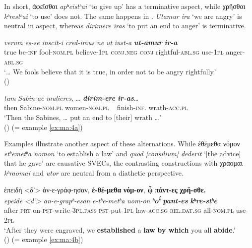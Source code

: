 \documentclass[output=paper,colorlinks,citecolor=brown]{langscibook}
\begin{document}
\z

In short, ἀφεῖσθαι \emph{apʰeistʰai} `to give up' has
a terminative aspect, while χρῆσθαι \emph{kʰrestʰai}
`to use' does not. The same happens in . \emph{Utamur ira} `we are angry' is
neutral in aspect, whereas \emph{dirimere iras} `to put an end to anger' is terminative.


\ea\label{ex:ma:6}

\ea\label{ex:ma:6a}


\gll \emph{verum} \emph{es-se} \emph{inscit-i} \emph{cred-imus} \emph{ne} \emph{ut}
\emph{iust-a} \textbf{\textit{ut-amur}} \textbf{\textit{ir-a}}\\
true be-\textsc{inf} fool-\textsc{nom.pl} believe-\textsc{1pl} \textsc{conj.neg} \textsc{conj} rightful\textsc{-abl.sg} use-\textsc{1pl} anger-\textsc{abl.sg}\\
\glt `\ldots{} We fools believe that it is true, in order not to be angry rightfully.' \\
\hspace*{\fill}()

\ex\label{ex:ma:6b}

\gll \emph{tum} \emph{Sabin-ae} \emph{mulieres,} \ldots{} \textbf{\itshape dirim-ere} \textbf{\itshape ir-as}\ldots{}\\
then Sabine-\textsc{nom.pl} women-\textsc{nom.pl} ~ finish-\textsc{inf.} wrath-\textsc{acc.pl}\\
\glt `Then the Sabines, \ldots{} put an end to {[}their{]} wrath \ldots' \\
\hspace*{\fill}() (=
example \ref{ex:ma:4a})

\z

\z

Examples  illustrate another aspect of these alternations. While
ἐθέμεθα νόμον \emph{etʰemetʰa nomon} `to establish a
law' and \emph{quod {[}consilium{]} dederit} `{[}the advice{]} that he gave' are causative
SVECs, the contrasting constructions with χράομαι \emph{kʰraomai} and
\emph{utor} are neutral from a diathetic perspective.


\ea\label{ex:ma:7}

\glll ἐπειδὴ <δ'> ἀν-ε-γράφ-ησαν, \textbf{ἐ-θέ-μεθα} \textbf{νόμ-ον}, \textbf{ᾧ} \textbf{πάντ-ες} \textbf{χρῆ-σθε.}\\
 \textit{epeide} \textit{<d'>} \textit{an-e-grapʰ-esan} \textit{e-tʰe-metʰa} \textit{nom-on} \textit{\textbf{ʰo\textsuperscript{i}}} \textit{\textbf{pant-es}}
\textit{\textbf{kʰre-stʰe}}\\
after \textsc{prt} on-\textsc{pst-}write-\textsc{3pl.pass} \textsc{pst-}put-\textsc{1pl}
law-\textsc{acc.sg} \textsc{rel.dat.sg} all-\textsc{nom.pl} use-\textsc{2pl}\\
\glt `After they were engraved, we \textbf{established} a \textbf{law} \textbf{by which} you all \textbf{abide}.' \\
\hspace*{\fill}() (= example \ref{ex:ma:4b})
\end{document}
